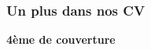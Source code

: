 \documentclass[11pt]{article}
\begin{document}
\subsubsection{Un plus dans nos CV}





\newpage
\thispagestyle{empty}
\begin{center}
\textbf{4ème de couverture}
\end{center}
\end{document}
